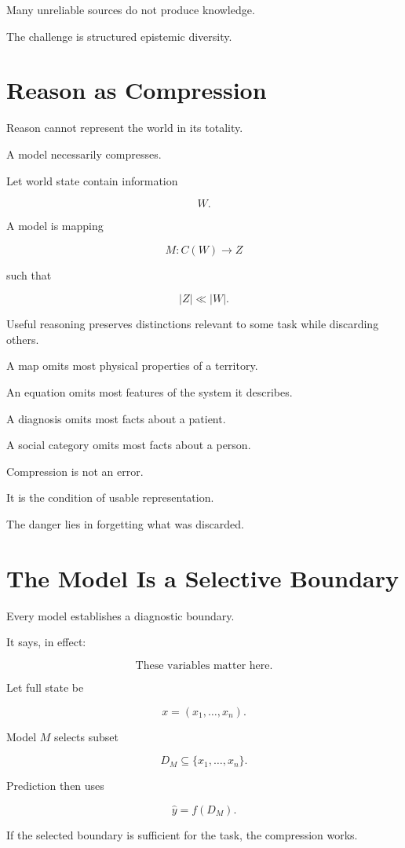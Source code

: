 \documentclass[11pt,oneside]{book}
\theoremstyle{definition}
\theoremstyle{remark}
\begin{document}
Many unreliable sources do not produce knowledge.

The challenge is structured epistemic diversity.

\section{Reason as Compression}

Reason cannot represent the world in its totality.

A model necessarily compresses.

Let world state contain information

\[
W.
\]

A model is mapping

\[
M:C(W)\rightarrow Z
\]

such that

\[
|Z|\ll|W|.
\]

Useful reasoning preserves distinctions relevant to some task while discarding others.

A map omits most physical properties of a territory.

An equation omits most features of the system it describes.

A diagnosis omits most facts about a patient.

A social category omits most facts about a person.

Compression is not an error.

It is the condition of usable representation.

The danger lies in forgetting what was discarded.

\section{The Model Is a Selective Boundary}

Every model establishes a diagnostic boundary.

It says, in effect:

\[
\text{These variables matter here.}
\]

Let full state be

\[
x=(x_1,\ldots,x_n).
\]

Model \(M\) selects subset

\[
D_M
\subseteq
\{x_1,\ldots,x_n\}.
\]

Prediction then uses

\[
\hat{y}
=
f(D_M).
\]

If the selected boundary is sufficient for the task, the compression works.
\end{document}
